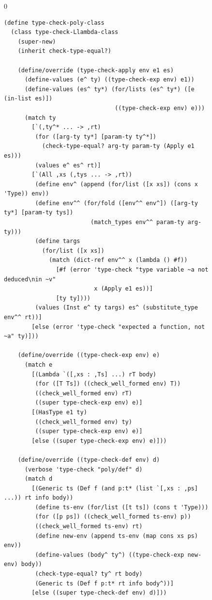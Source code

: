 \documentclass[7x10]{TimesAPriori_MIT}%
\def\racketEd{0}
\def\edition{1}
\numberwithin{theorem}{chapter}
\numberwithin{definition}{chapter}
\numberwithin{equation}{chapter}
\begin{document}
\begin{figure}[tbp]
  \begin{tcolorbox}[colback=white]
{\if\edition\racketEd    
\begin{lstlisting}[basicstyle=\ttfamily\scriptsize]
(define type-check-poly-class
  (class type-check-Llambda-class
    (super-new)
    (inherit check-type-equal?)
  
    (define/override (type-check-apply env e1 es)
      (define-values (e^ ty) ((type-check-exp env) e1))
      (define-values (es^ ty*) (for/lists (es^ ty*) ([e (in-list es)])
                                ((type-check-exp env) e)))
      (match ty
        [`(,ty^* ... -> ,rt)
         (for ([arg-ty ty*] [param-ty ty^*])
           (check-type-equal? arg-ty param-ty (Apply e1 es)))
         (values e^ es^ rt)]
        [`(All ,xs (,tys ... -> ,rt))
         (define env^ (append (for/list ([x xs]) (cons x 'Type)) env))
         (define env^^ (for/fold ([env^^ env^]) ([arg-ty ty*] [param-ty tys])
                         (match_types env^^ param-ty arg-ty)))
         (define targs
           (for/list ([x xs])
             (match (dict-ref env^^ x (lambda () #f))
               [#f (error 'type-check "type variable ~a not deduced\nin ~v"
                          x (Apply e1 es))]
               [ty ty])))
         (values (Inst e^ ty targs) es^ (substitute_type env^^ rt))]
        [else (error 'type-check "expected a function, not ~a" ty)]))
    
    (define/override ((type-check-exp env) e)
      (match e
        [(Lambda `([,xs : ,Ts] ...) rT body)
         (for ([T Ts]) ((check_well_formed env) T))
         ((check_well_formed env) rT)
         ((super type-check-exp env) e)]
        [(HasType e1 ty)
         ((check_well_formed env) ty)
         ((super type-check-exp env) e)]
        [else ((super type-check-exp env) e)]))

    (define/override ((type-check-def env) d)
      (verbose 'type-check "poly/def" d)
      (match d
        [(Generic ts (Def f (and p:t* (list `[,xs : ,ps] ...)) rt info body))
         (define ts-env (for/list ([t ts]) (cons t 'Type)))
         (for ([p ps]) ((check_well_formed ts-env) p))
         ((check_well_formed ts-env) rt)
         (define new-env (append ts-env (map cons xs ps) env))
         (define-values (body^ ty^) ((type-check-exp new-env) body))
         (check-type-equal? ty^ rt body)
         (Generic ts (Def f p:t* rt info body^))]
        [else ((super type-check-def env) d)]))


\end{lstlisting}}
\end{tcolorbox}
\end{figure}
\end{document}
